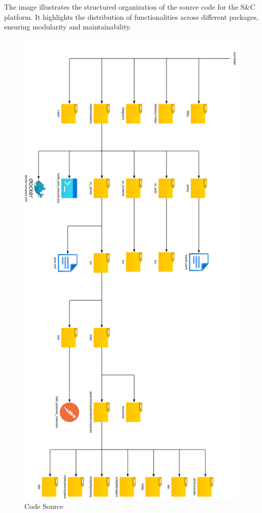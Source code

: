 The image illustrates the structured organization of the source code for the S\&C platform. It highlights the distribution of functionalities across different packages, ensuring modularity and maintainability.

\begin{figure}[H]
    \centering
    \includegraphics[width=0.55\linewidth]{Latex/Images/ITD/CodeSource.png}
    \caption{Code Source}
    \label{fig:codesource}
\end{figure}